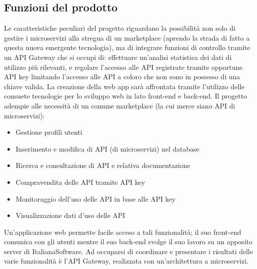 \subsection{Funzioni del prodotto}
Le caratteristiche peculiari del progetto riguardano la possibilità non solo di gestire i microservizi alla stregua di un marketplace (aprendo la strada di fatto a questa nuova emergente tecnologia), ma di integrare funzioni di controllo tramite un API Gateway che si occupi di: effettuare un'analisi statistica dei dati di utilizzo più rilevanti, e regolare l'accesso alle API registrate tramite opportune API key limitando l'accesso alle API a coloro che non sono in possesso di una chiave valida. La creazione della web app sarà affrontata tramite l'utilizzo delle consuete tecnologie per lo sviluppo web in lato front-end e back-end. Il progetto adempie alle necessità di un comune marketplace (la cui merce siano API di microservizi):
\begin{itemize}
\item Gestione profili utenti \\
\item Inserimento e modifica di API (di microservizi) nel database \\
\item Ricerca e consultazione di API e relativa documentazione \\
\item Compravendita delle API tramite API key \\
\item Monitoraggio dell'uso delle API in base alle API key \\
\item Visualizzazione dati d'uso delle API \\
\end{itemize}
Un'applicazione web permette facile acceso a tali funzionalità; il suo front-end comunica con gli utenti mentre il suo back-end svolge il suo lavoro su un apposito server di ItalianaSoftware. Ad occuparsi di coordinare e presentare i risultati delle varie funzionalità è l'API Gateway, realizzata con un'architettura a microservizi.

